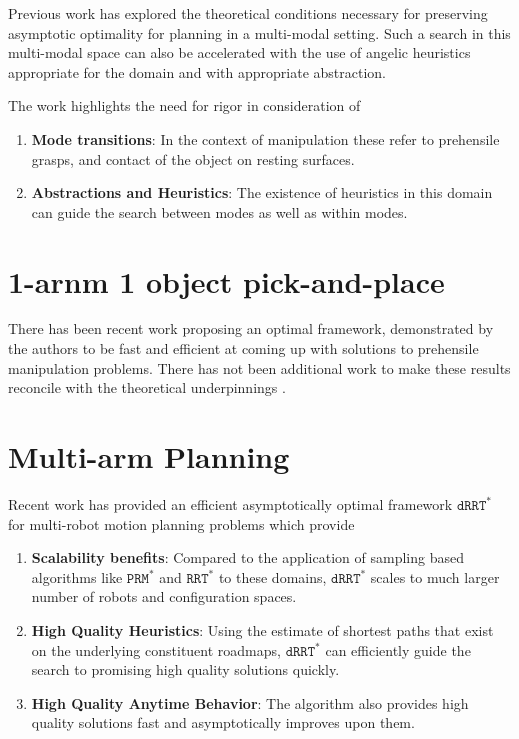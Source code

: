 Previous work \cite{vega2016asymptotically} has explored the theoretical conditions necessary for preserving asymptotic optimality for planning in a multi-modal setting. Such a search in this multi-modal space can also be accelerated with the use of angelic heuristics \cite{vega2018admissible} appropriate for the domain and with appropriate abstraction.

The work highlights the need for rigor in consideration of
\begin{enumerate}
\item \textbf{Mode transitions}: In the context of manipulation these refer to prehensile grasps, and contact of the object on resting surfaces.
\item \textbf{Abstractions and Heuristics}: The existence of heuristics in this domain can guide the search between modes as well as within modes.
\end{enumerate}

\section{1-arnm 1 object pick-and-place}
There has been recent work \cite{schmitt2017optimal} proposing an optimal framework, demonstrated by the authors to be fast and efficient at coming up with solutions to prehensile manipulation problems. There has not been additional work to make these results reconcile with the theoretical underpinnings \cite{vega2016asymptotically}.


\section{Multi-arm Planning}
Recent work \cite{Dobson:2017aa,shome2017improving} has provided an efficient asymptotically optimal framework $\mathtt{dRRT}^*$ for multi-robot motion planning problems which provide 
\begin{enumerate}
\item \textbf{Scalability benefits}: Compared to the application of sampling based algorithms like $\mathtt{PRM}^*$ and $\mathtt{RRT}^*$ to these domains, $\mathtt{dRRT}^*$ scales to much larger number of robots and configuration spaces.
\item \textbf{High Quality Heuristics}: Using the estimate of shortest paths that exist on the underlying constituent roadmaps, $\mathtt{dRRT}^*$ can efficiently guide the search to promising high quality solutions quickly.
\item \textbf{High Quality Anytime Behavior}: The algorithm also provides high quality solutions fast and asymptotically improves upon them.
\end{enumerate}



